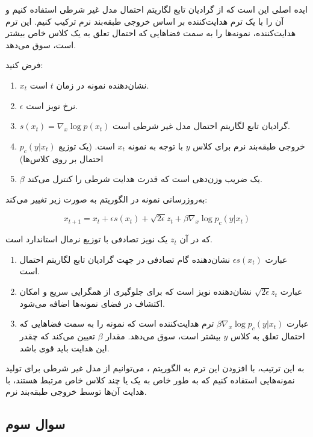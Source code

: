 ایده اصلی این است که از گرادیان تابع لگاریتم احتمال  مدل  غیر شرطی استفاده کنیم و آن را با یک ترم هدایت‌کننده  بر اساس خروجی طبقه‌بند نرم ترکیب کنیم. این ترم هدایت‌کننده، نمونه‌ها را به سمت فضاهایی که احتمال تعلق به یک کلاس خاص بیشتر است، سوق می‌دهد.


فرض کنید:
\begin{enumerate}
    \item   $x_t$ نشان‌دهنده نمونه در زمان $t$ است.
    \item $\epsilon$ نرخ نویز  است.
    \item  $s(x_t) = \nabla_x \log p(x_t)$ گرادیان تابع لگاریتم احتمال  مدل  غیر شرطی است.
    \item  $p_c(y|x_t)$ خروجی طبقه‌بند نرم برای کلاس $y$ با توجه به نمونه $x_t$ است. (یک توزیع احتمال بر روی کلاس‌ها)
    \item $\beta$ یک ضریب وزن‌دهی  است که قدرت هدایت شرطی را کنترل می‌کند.
\end{enumerate} 

به‌روزرسانی نمونه در الگوریتم  به صورت زیر تغییر می‌کند:

$$
x_{t+1} = x_t + \epsilon s(x_t) + \sqrt{2\epsilon} z_t + \beta \nabla_{x} \log p_c(y|x_t)
$$

که در آن $z_t$ یک نویز تصادفی با توزیع نرمال استاندارد است.
\begin{enumerate}
\item  عبارت $\epsilon s(x_t)$ نشان‌دهنده گام تصادفی در جهت گرادیان تابع لگاریتم احتمال است.
\item  عبارت $\sqrt{2\epsilon} z_t$ نشان‌دهنده نویز است که برای جلوگیری از همگرایی سریع و امکان اکتشاف در فضای نمونه‌ها اضافه می‌شود.
\item  عبارت $\beta \nabla_{x} \log p_c(y|x_t)$  ترم هدایت‌کننده است که نمونه را به سمت فضاهایی که احتمال تعلق به کلاس $y$ بیشتر است، سوق می‌دهد.  مقدار $\beta$ تعیین می‌کند که چقدر این هدایت باید قوی باشد.
\end{enumerate}
به این ترتیب، با افزودن این ترم به الگوریتم ، می‌توانیم از مدل  غیر شرطی برای تولید نمونه‌هایی استفاده کنیم که به طور خاص به یک یا چند کلاس خاص مرتبط هستند، با هدایت آن‌ها توسط خروجی طبقه‌بند نرم.

\subsection{سوال سوم}

